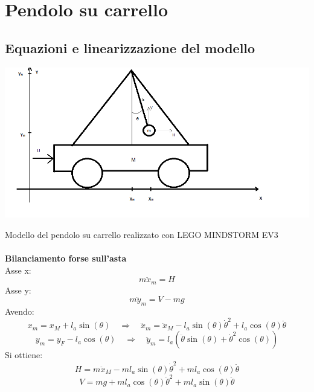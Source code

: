 
\chapter{Pendolo su carrello}
\section{Equazioni e linearizzazione del modello}

\begin{center}
\includegraphics[scale=0.6]{pendolo.png}
\end{center}
Modello del pendolo su carrello realizzato con LEGO MINDSTORM EV3\\\\
\textbf{Bilanciamento forse sull'asta}\\
Asse x:
\begin{equation}
m\ddot{x}_m=H
\end{equation}
Asse y:
\begin{equation}
m\ddot{y}_m=V-mg
\end{equation}
Avendo:\\
\begin{equation}
x_m = x_M+l_a\sin(\theta) \quad \Rightarrow \quad \ddot{x}_m=\ddot{x}_M-l_a\sin(\theta)\dot{\theta}^2+l_a\cos(\theta)\ddot{\theta}
\end{equation}
\begin{equation}
y_m=y_F-l_a\cos(\theta) \quad \Rightarrow \quad \ddot{y}_m=l_a(\ddot{\theta}\sin(\theta)+\dot{\theta}^2\cos(\theta))
\end{equation}
Si ottiene:
\begin{equation}\label{H}
H=m\ddot{x}_M-ml_a\sin(\theta)\dot{\theta}^2+ml_a\cos(\theta)\ddot{\theta}
\end{equation}
\begin{equation}\label{V}
V=mg+ml_a\cos(\theta)\dot{\theta}^2+ml_a\sin(\theta)\ddot{\theta}
\end{equation}
